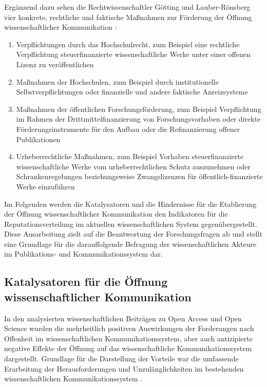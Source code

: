 Ergänzend dazu sehen die Rechtwissenschaftler Götting und Lauber-Rönsberg vier konkrete, rechtliche und faktische Maßnahmen zur Förderung der Öffnung wissenschaftlicher Kommunikation \cite[:138]{Goetting_2015}:
\begin{enumerate}
\item Verpflichtungen durch das Hochschulrecht, zum Beispiel eine rechtliche Verpflichtung steuerfinanzierte wissenschaftliche Werke unter einer offenen Lizenz zu veröffentlichen
\item Maßnahmen der Hochschulen, zum Beispiel durch institutionelle Selbstverpflichtungen oder finanzielle und andere faktische Anreizsysteme
\item Maßnahmen der öffentlichen Forschungsförderung, zum Beispiel Verpflichtung im Rahmen der Drittmittelfinanzierung von Forschungsvorhaben oder direkte Förderungsinstrumente für den Aufbau oder die Refinanzierung offener Publikationen
\item Urheberrechtliche Maßnahmen, zum Beispiel Vorhaben steuerfinanzierte wissenschaftliche Werke vom urheberrechtlichen Schutz auszunehmen oder Schrankenregelungen beziehungsweise Zwangslizenzen für öffentlich-finanzierte Werke einzuführen
\end{enumerate}

Im Folgenden werden die Katalysatoren und die Hindernisse für die Etablierung der Öffnung wissenschaftlicher Kommunikation den Indikatoren für die Reputationsverteilung im aktuellen wissenschaftlichen System gegenübergestellt. Diese Ausarbeitung zielt auf die Beantwortung der Forschungsfragen ab und stellt eine Grundlage für die darauffolgende Befragung der wissenschaftlichen Akteure im Publikations- und Kommunikationssystem dar.

\subsection{Katalysatoren für die Öffnung wissenschaftlicher Kommunikation}

In den analysierten wissenschaftlichen Beiträgen zu Open Access und Open Science wurden die mehrheitlich positiven Auswirkungen der Forderungen nach Offenheit im wissenschaftlichen Kommunikationssystem, aber auch antizipierte negative Effekte der Öffnung auf das wissenschaftliche Kommunikationssystem dargestellt. Grundlage für die Darstellung der Vorteile war die umfassende Erarbeitung der Herausforderungen und Unzulänglichkeiten im bestehenden wissenschaftlichen Kommunikationssystem \cite{Herb_2012a}.

